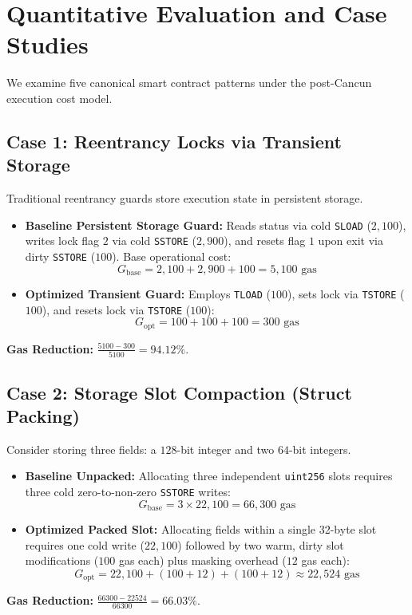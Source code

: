 \documentclass[conference]{IEEEtran}
\begin{document}
\section{Quantitative Evaluation and Case Studies}

We examine five canonical smart contract patterns under the post-Cancun execution cost model.

\subsection{Case 1: Reentrancy Locks via Transient Storage}
Traditional reentrancy guards store execution state in persistent storage.
\begin{itemize}
    \item \textbf{Baseline Persistent Storage Guard:} Reads status via cold \texttt{SLOAD} ($2,100$), writes lock flag $2$ via cold \texttt{SSTORE} ($2,900$), and resets flag $1$ upon exit via dirty \texttt{SSTORE} ($100$). Base operational cost:
    \begin{equation}
    G_{\text{base}} = 2,100 + 2,900 + 100 = 5,100 \text{ gas}
    \end{equation}
    \item \textbf{Optimized Transient Guard:} Employs \texttt{TLOAD} ($100$), sets lock via \texttt{TSTORE} ($100$), and resets lock via \texttt{TSTORE} ($100$):
    \begin{equation}
    G_{\text{opt}} = 100 + 100 + 100 = 300 \text{ gas}
    \end{equation}
\end{itemize}
\textbf{Gas Reduction:} $\frac{5100 - 300}{5100} = \mathbf{94.12\%}$.

\subsection{Case 2: Storage Slot Compaction (Struct Packing)}
Consider storing three fields: a $128$-bit integer and two $64$-bit integers.
\begin{itemize}
    \item \textbf{Baseline Unpacked:} Allocating three independent \texttt{uint256} slots requires three cold zero-to-non-zero \texttt{SSTORE} writes:
    \begin{equation}
    G_{\text{base}} = 3 \times 22,100 = 66,300 \text{ gas}
    \end{equation}
    \item \textbf{Optimized Packed Slot:} Allocating fields within a single 32-byte slot requires one cold write ($22,100$) followed by two warm, dirty slot modifications ($100$ gas each) plus masking overhead ($12$ gas each):
    \begin{equation}
    G_{\text{opt}} = 22,100 + (100 + 12) + (100 + 12) \approx 22,524 \text{ gas}
    \end{equation}
\end{itemize}
\textbf{Gas Reduction:} $\frac{66300 - 22524}{66300} = \mathbf{66.03\%}$.
\end{document}
